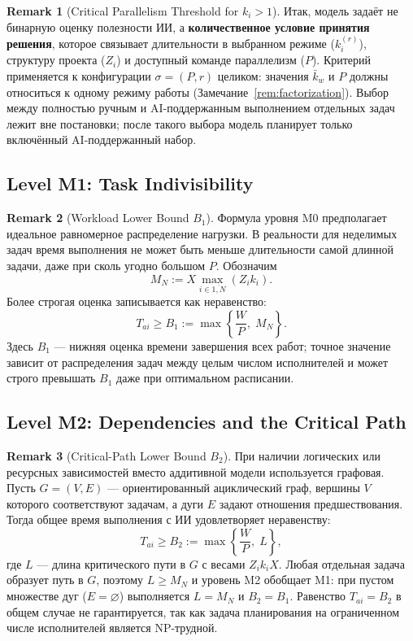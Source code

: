 \documentclass[12pt,a4paper]{article}
\theoremstyle{definition}
\newtheorem{remark}{Remark}
\begin{document}
\begin{remark}[Critical Parallelism Threshold for $k_i > 1$]
Итак, модель задаёт не бинарную оценку полезности ИИ, а \textbf{количественное условие принятия решения}, которое связывает длительности в выбранном режиме ($k_i^{(r)}$), структуру проекта ($Z_i$) и доступный команде параллелизм ($P$). Критерий применяется к конфигурации $\sigma = (P, r)$ целиком: значения $\bar{k}_w$ и $P$ должны относиться к одному режиму работы (Замечание~\ref{rem:factorization}). Выбор между полностью ручным и AI-поддержанным выполнением отдельных задач лежит вне постановки; после такого выбора модель планирует только включённый AI-поддержанный набор.
\end{remark}

\subsection{Level M1: Task Indivisibility}

\begin{remark}[Workload Lower Bound $B_1$]\label{rem:indivisible}
Формула уровня M0 предполагает идеальное равномерное распределение нагрузки. В реальности для неделимых задач время выполнения не может быть меньше длительности самой длинной задачи, даже при сколь угодно большом $P$. Обозначим
\[
  M_N := X \max_{i \in \overline{1,N}} (Z_i k_i).
\]
Более строгая оценка записывается как неравенство:
\[
  T_{ai} \ge B_1 := \max\left\{ \frac{W}{P},\; M_N \right\}.
\]
Здесь $B_1$ --- нижняя оценка времени завершения всех работ; точное значение зависит от распределения задач между целым числом исполнителей и может строго превышать $B_1$ даже при оптимальном расписании.
\end{remark}

\subsection{Level M2: Dependencies and the Critical Path}

\begin{remark}[Critical-Path Lower Bound $B_2$]\label{rem:graph}
При наличии логических или ресурсных зависимостей вместо аддитивной модели используется графовая. Пусть $G = (V, E)$ --- ориентированный ациклический граф, вершины $V$ которого соответствуют задачам, а дуги $E$ задают отношения предшествования. Тогда общее время выполнения с ИИ удовлетворяет неравенству:
\[
  T_{ai} \ge B_2 := \max\left\{ \frac{W}{P},\; L \right\},
\]
где $L$ --- длина критического пути в $G$ с весами $Z_i k_i X$. Любая отдельная задача образует путь в $G$, поэтому $L \ge M_N$ и уровень M2 обобщает M1: при пустом множестве дуг ($E = \varnothing$) выполняется $L = M_N$ и $B_2 = B_1$. Равенство $T_{ai} = B_2$ в общем случае не гарантируется, так как задача планирования на ограниченном числе исполнителей является NP-трудной.
\end{remark}
\end{document}
